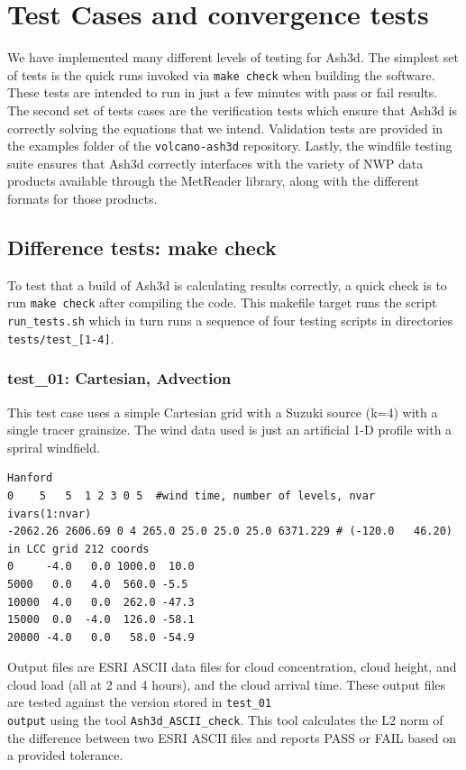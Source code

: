 \chapter{Test Cases and convergence tests}\label{ChapAppendTestCases}

We have implemented many different levels of testing for Ash3d. The simplest
set of tests is the quick runs invoked via \texttt{make check} when building
the software. These tests are intended to run in just a few minutes with
pass or fail results. The second set of tests cases are the verification tests
which ensure that Ash3d is correctly solving the equations that we intend.
Validation tests are provided in the examples folder of the \texttt{volcano-ash3d}
repository. Lastly, the windfile testing suite ensures that Ash3d correctly
interfaces with the variety of NWP data products available through the MetReader
library, along with the different formats for those products.

\section{Difference tests: make check}
To test that a build of Ash3d is calculating results correctly, a quick check is to
run \texttt{make check} after compiling the code. This makefile target runs
the script \texttt{run\_tests.sh} which in turn runs a sequence of four testing
scripts in directories \texttt{tests/test\_[1-4]}. 
\subsection{test\_01: Cartesian, Advection}
This test case uses a simple Cartesian grid with a Suzuki source (k=4) with
a single tracer grainsize. The wind data used is just an artificial 1-D
profile with a spriral windfield.
\small
\begin{verbatim}
Hanford
0    5   5  1 2 3 0 5  #wind time, number of levels, nvar ivars(1:nvar)
-2062.26 2606.69 0 4 265.0 25.0 25.0 25.0 6371.229 # (-120.0   46.20) in LCC grid 212 coords
0     -4.0   0.0 1000.0  10.0
5000   0.0   4.0  560.0 -5.5
10000  4.0   0.0  262.0 -47.3
15000  0.0  -4.0  126.0 -58.1
20000 -4.0   0.0   58.0 -54.9
\end{verbatim}
\normalsize
Output files are ESRI ASCII data files for cloud concentration, cloud height, and
cloud load (all at 2 and 4 hours), and the cloud arrival time. These output
files are tested against the version stored in \texttt{test\_01\\output}
using the tool \texttt{Ash3d\_ASCII\_check}. This tool calculates the L2 norm
of the difference between two ESRI ASCII files and reports PASS or FAIL based
on a provided tolerance.

